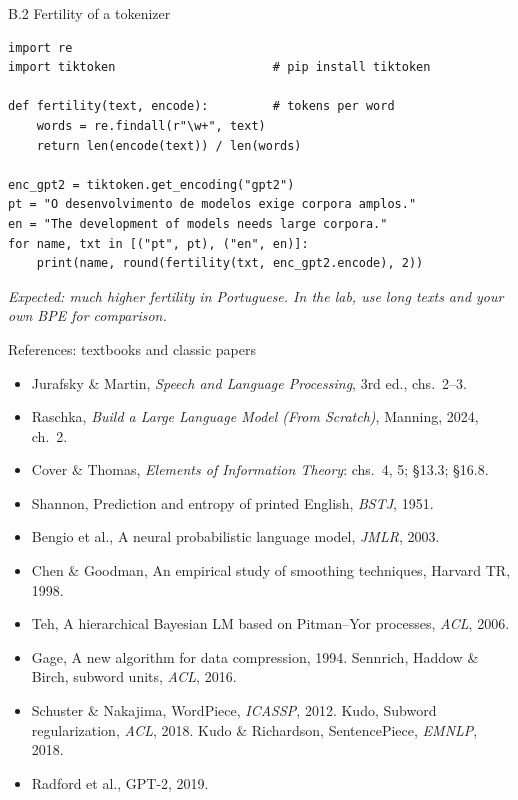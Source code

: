 \documentclass[11pt,aspectratio=169]{beamer}
\newcommand{\hook}[1]{{\small\textcolor{gray!60!black}{\textit{#1}}}}
\begin{document}
\begin{frame}[fragile]{B.2 Fertility of a tokenizer}
\begin{lstlisting}[style=py]
import re
import tiktoken                      # pip install tiktoken

def fertility(text, encode):         # tokens per word
    words = re.findall(r"\w+", text)
    return len(encode(text)) / len(words)

enc_gpt2 = tiktoken.get_encoding("gpt2")
pt = "O desenvolvimento de modelos exige corpora amplos."
en = "The development of models needs large corpora."
for name, txt in [("pt", pt), ("en", en)]:
    print(name, round(fertility(txt, enc_gpt2.encode), 2))
\end{lstlisting}
\hook{Expected: much higher fertility in Portuguese. In the lab, use long texts and your own
BPE for comparison.}
\end{frame}

\begin{frame}{References: textbooks and classic papers}
  \small
  \begin{itemize}
    \item Jurafsky \& Martin, \emph{Speech and Language Processing}, 3rd ed., chs.~2--3.
    \item Raschka, \emph{Build a Large Language Model (From Scratch)}, Manning, 2024, ch.~2.
    \item Cover \& Thomas, \emph{Elements of Information Theory}: chs.~4, 5; §13.3; §16.8.
    \item Shannon, Prediction and entropy of printed English, \emph{BSTJ}, 1951.
    \item Bengio et al., A neural probabilistic language model, \emph{JMLR}, 2003.
    \item Chen \& Goodman, An empirical study of smoothing techniques, Harvard TR, 1998.
    \item Teh, A hierarchical Bayesian LM based on Pitman--Yor processes, \emph{ACL}, 2006.
    \item Gage, A new algorithm for data compression, 1994.
          Sennrich, Haddow \& Birch, subword units, \emph{ACL}, 2016.
    \item Schuster \& Nakajima, WordPiece, \emph{ICASSP}, 2012.
          Kudo, Subword regularization, \emph{ACL}, 2018.
          Kudo \& Richardson, SentencePiece, \emph{EMNLP}, 2018.
    \item Radford et al., GPT-2, 2019.
  \end{itemize}
\end{frame}
\end{document}
